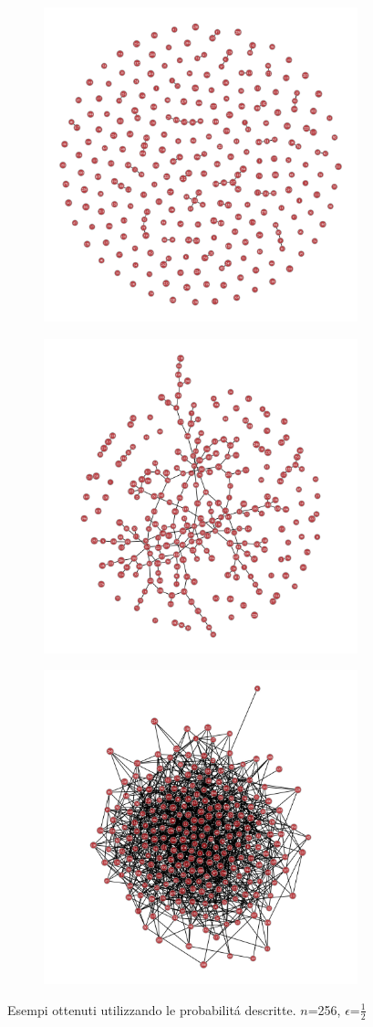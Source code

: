\documentclass[../Tesi.tex]{subfiles}
\begin{document}
\begin{figure}[H]
\centering
    \begin{subfigure}{0.3\textwidth}
      \centering
      \includegraphics[width=0.6\linewidth]{imgs/ER_Examples/ER_SP.png}
      \caption{}
      \label{fig:sub1}
    \end{subfigure}%
    \begin{subfigure}{0.3\textwidth}
      \centering
      \includegraphics[width=0.6\linewidth]{imgs/ER_Examples/ER_GC.png}
      \caption{}
      \label{fig:sub2}
    \end{subfigure}
    \begin{subfigure}{0.3\textwidth}
      \centering
      \includegraphics[width=0.6\linewidth]{imgs/ER_Examples/ER_DN.png}
      \caption{}
      \label{fig:sub1}
    \end{subfigure}%
\caption*{Esempi ottenuti utilizzando le probabilit\'a descritte. $n$=256, $\epsilon$=$\frac{1}{2}$}
\end{figure}
\end{document}
